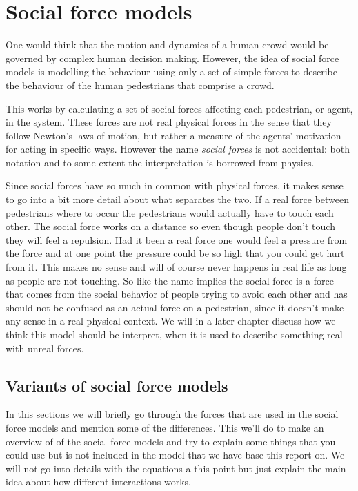 \section{Social force models}
\label{sec:social-forces}
One would think that the motion and dynamics of a human crowd would be 
governed by complex human decision making. However, the idea of social force 
models is modelling the behaviour using only a set of simple forces to 
describe the behaviour of the human pedestrians that comprise a crowd.

This works by calculating a set of social forces affecting each pedestrian, or 
agent, in the system. These forces are not real physical forces in the sense 
that they follow Newton's laws of motion, but rather a measure of the agents' 
motivation for acting in specific ways. However the name \emph{social forces} 
is not accidental: both notation and to some extent the interpretation is 
borrowed from physics. 

Since social forces have so much in common with physical forces, it makes 
sense to go into a bit more detail about what separates the two. If a real force between pedestrians where to occur the pedestrians would actually have to touch each other. The social force works on a distance so even though people don't touch they will feel a repulsion. Had it been a real force one would feel a pressure from the force and at one point the pressure could be so high that you could get hurt from it. This makes no sense and will of course never happens in real life as long as people are not touching. So like the name implies the social force is a force that comes from the social behavior of people trying to avoid each other and has should not be confused as an actual force on a pedestrian, since it doesn't make any sense in a real physical context.  We will in a later chapter discuss how we think this model should be interpret, when it is used to describe something real with unreal forces.   


\subsection{Variants of social force models}
In this sections we will briefly go through the forces that are used in the social force models and mention some of the differences. This we'll do to make an overview of of the social force models and try to explain some things that you could use but is not included in the model that we have base this report on. We will not go into details with the equations a this point but just explain the main idea about how different interactions works. 

